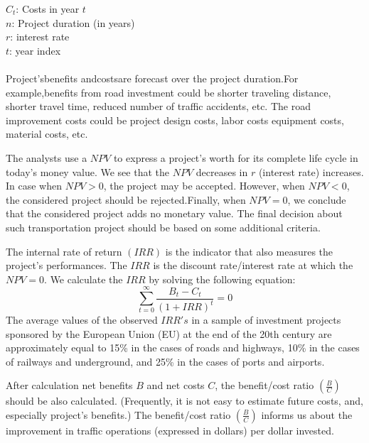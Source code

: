 \hspace*{10mm}$C_t$: Costs in year $t$\\
\hspace*{10mm}$n$: Project duration (in years)\\
\hspace*{10mm}$r$: interest rate\\
\hspace*{10mm}$t$: year index\\\\
%
Project’sbenefits andcostsare forecast over the project duration.For example,benefits from road investment could be shorter traveling distance, shorter travel time, reduced number of traffic accidents, etc. The road improvement costs could be project design costs, labor costs equipment costs, material costs, etc.\\
\par
The analysts use a $NPV$ to express a project’s worth for its complete life cycle in today’s money value. We see that the $NPV$ decreases in $r$ (interest rate) increases. In case when $NPV > 0$, the project may be accepted. However, when $NPV < 0$, the considered project should be rejected.Finally, when $NPV = 0$, we conclude that the considered project adds no monetary value. The final decision about such transportation project should be based on some additional criteria.\\
\par
The internal rate of return $(IRR)$ is the indicator that also measures the project’s performances. The $IRR$ is the discount rate/interest rate at which the $NPV = 0$. We calculate the $IRR$ by solving the following equation:
\begin{equation}
	\sum_{t = 0}^{\infty} \frac{B_t - C_t}{(1 + IRR)^t} = 0
\end{equation}
%
The average values of the observed $IRR's$ in a sample of investment projects sponsored by the European Union (EU) at the end of the 20th century are approximately equal to 15\% in the cases of roads and highways, 10\% in the cases of railways and underground, and 25\% in the cases of ports and airports.\\
\par
After calculation net benefits $B$ and net costs $C$, the benefit/cost ratio $\left( \frac{B}{C} \right)$ should be also calculated. (Frequently, it is not easy to estimate future costs, and, especially project’s benefits.) The benefit/cost ratio $\left( \frac{B}{C} \right)$ informs us about the improvement in traffic operations (expressed in dollars) per dollar invested.\\

